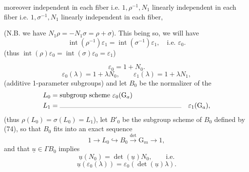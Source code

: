 
 moreover  independent in each fiber i.e. $1,\rho^{-1},N_1$ linearly independent in each fiber i.e. $1,\sigma^{-1},N_1$ linearly independent in each fiber, 



(N.B. we have $N_1\rho=-N_1\sigma=\rho+\sigma$). This being so, we will have
\[
\operatorname{int}(\rho^{-1})\varepsilon_1=\operatorname{int}(\sigma^{-1})\varepsilon_1,\quad\text{i.e. }\varepsilon_0.
\]
(thus $\operatorname{int}(\rho)\varepsilon_0=\operatorname{int}(\sigma)\varepsilon_0=\varepsilon_1$)

\[
\varepsilon_0=1+N_0.
\]
 
\[
\varepsilon_0(\lambda)=1+\lambda N_0,\qquad\varepsilon_1(\lambda)=1+\lambda N_1,
\]
(additive 1-parameter subgroups)
and let $B_0$ be the  normalizer  of the
\[
\begin{aligned}
L_0&=\text{subgroup scheme }\varepsilon_0(\mathrm G_a)\\
L_1&=\text{\rule{6.3cm}{0.2pt}}\quad\varepsilon_1(\mathrm G_a),
\end{aligned}
\]
(thus $\rho(L_0)=\sigma(L_0)=L_1$),
let $B'_0$ be the subgroup scheme of $B_0$ defined  by (74), so that $B_0$ fits into an exact sequence
\[
1\longrightarrow L_0\hookrightarrow B_0\xrightarrow{\det}\mathrm G_m\longrightarrow1,
\]
and that $\underline u\in\Gamma B_0$ implies
\[
\underline u(N_0)=\det(\underline u)N_0,\qquad\text{i.e.}
\]
\[
\underline u(\varepsilon_0(\lambda))=\varepsilon_0(\det(\underline u)\lambda).
\]

